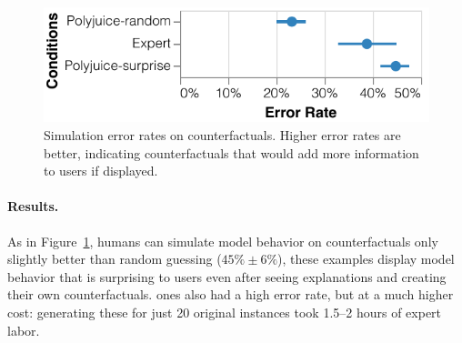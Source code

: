 
\begin{figure}[t]
\centering
\includegraphics[width=1\columnwidth]{figures/err_rate.pdf}
\vspace{-15pt}
\caption{
Simulation error rates on counterfactuals. Higher error rates are better, indicating counterfactuals that would add more information to users if displayed.
}
\vspace{-10pt}
\label{fig:err_rate}
\end{figure}

\paragraph{Results.}
As in Figure~\ref{fig:err_rate}, humans can simulate model behavior on \cshap counterfactuals only slightly better than random guessing ($45\%\pm6\%$), \ie these examples display model behavior that is surprising to users even after seeing explanations and creating their own counterfactuals. \chuman ones also had a high error rate, but at a much higher cost: generating these for just 20 original instances took 1.5--2 hours of expert labor.

